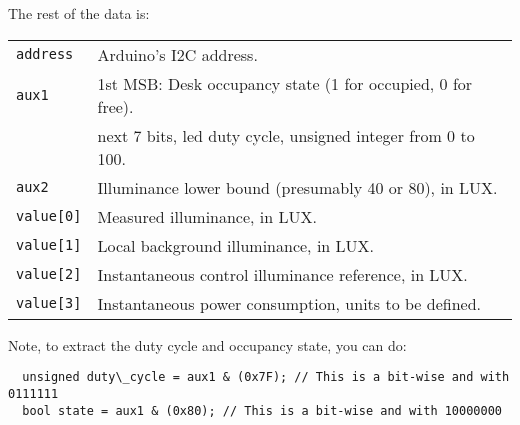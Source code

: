 \documentclass[english,palatino]{ist-report}
\newcommand{\ccode}[1]{\texttt{#1}}
\begin{document}
The rest of the data is:
\begin{table}[h]
  \centering
  \begin{tabular}[h]{l|l}
    \ccode{address} & Arduino's I2C address. \\
    \ccode{aux1}    & 1st MSB: Desk occupancy state (1 for occupied, 0 for free). \\
                    & next 7 bits, led duty cycle, unsigned integer from 0 to 100. \\
    \ccode{aux2}    & Illuminance lower bound (presumably 40 or 80), in LUX. \\
    \ccode{value[0]}& Measured illuminance, in LUX. \\
    \ccode{value[1]}& Local background illuminance, in LUX. \\
    \ccode{value[2]}& Instantaneous control illuminance reference, in LUX. \\
    \ccode{value[3]}& Instantaneous power consumption, units to be defined. 
  \end{tabular}
\end{table}

Note, to extract the duty cycle and occupancy state, you can do:
\begin{verbatim}
  unsigned duty\_cycle = aux1 & (0x7F); // This is a bit-wise and with 0111111
  bool state = aux1 & (0x80); // This is a bit-wise and with 10000000 
\end{verbatim}
\end{document}
